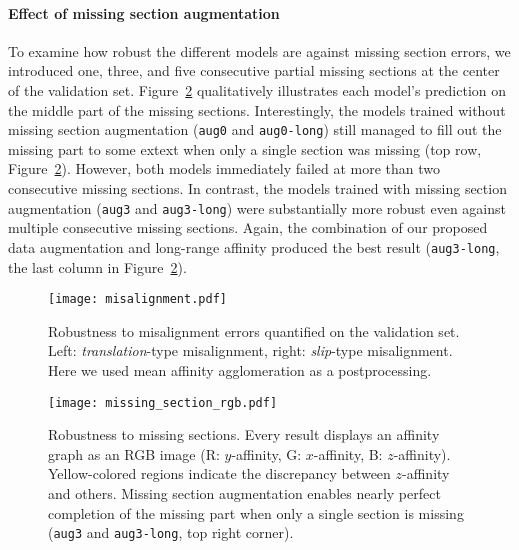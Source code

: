\documentclass{article}
\begin{document}
\paragraph{Effect of missing section augmentation} To examine how robust the
different models are against missing section errors, we introduced one, three,
and five consecutive partial missing sections at the center of the validation
set. Figure~\ref{fig:missing} qualitatively illustrates each model's prediction
on the middle part of the missing sections. Interestingly, the models trained
without missing section augmentation (\texttt{aug0} and \texttt{aug0-long})
still managed to fill out the missing part to some extext when only a single
section was missing (top row, Figure~\ref{fig:missing}). However, both models
immediately failed at more than two consecutive missing sections. In contrast,
the models trained with missing section augmentation (\texttt{aug3} and
\texttt{aug3-long}) were substantially more robust even against multiple
consecutive missing sections. Again, the combination of our proposed data
augmentation and long-range affinity produced the best result
(\texttt{aug3-long}, the last column in Figure~\ref{fig:missing}).

\begin{figure}
\begin{center}
\texttt{[image: misalignment.pdf]}
\end{center}

\caption{Robustness to misalignment errors quantified on the validation set.
Left: \textit{translation}-type misalignment, right: \textit{slip}-type
misalignment. Here we used mean affinity agglomeration as a postprocessing.}

\label{fig:misalign}
\end{figure}

\begin{figure}
\begin{center}
\texttt{[image: missing\_section\_rgb.pdf]}
\end{center}
\caption{Robustness to missing sections. Every result displays an affinity graph
as an RGB image (R: $y$-affinity, G: $x$-affinity, B: $z$-affinity).
Yellow-colored regions indicate the discrepancy between $z$-affinity and others.
Missing section augmentation enables nearly perfect completion of the missing
part when only a single section is missing (\texttt{aug3} and
\texttt{aug3-long}, top right corner).}
\label{fig:missing}
\end{figure}
\end{document}
